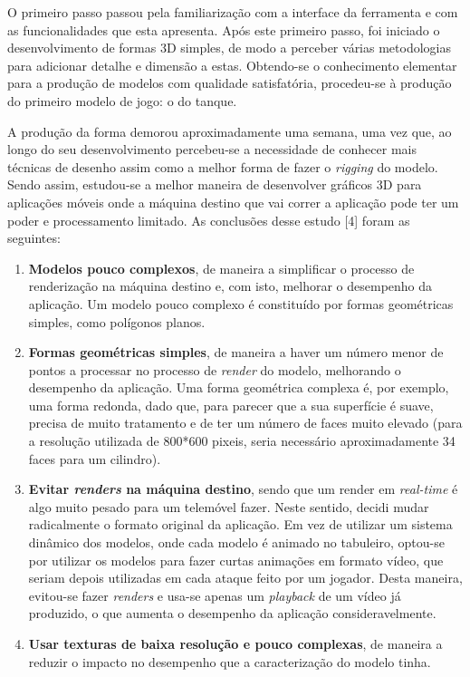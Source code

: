 O primeiro passo passou pela familiarização com a interface da ferramenta e com as funcionalidades que esta apresenta. Após este primeiro passo, foi iniciado o desenvolvimento de formas 3D simples, de modo a perceber várias metodologias para adicionar detalhe e dimensão a estas. Obtendo-se o conhecimento elementar para a produção de modelos com qualidade satisfatória, procedeu-se à produção do primeiro modelo de jogo: o do tanque.

A produção da forma demorou aproximadamente uma semana, uma vez que, ao longo do seu desenvolvimento percebeu-se a necessidade de conhecer mais técnicas de desenho assim como a melhor forma de fazer o \textit{rigging} do modelo.
Sendo assim, estudou-se a melhor maneira de desenvolver gráficos 3D para aplicações móveis onde a máquina destino que vai correr a aplicação pode ter um poder e processamento limitado. As conclusões desse estudo [4] foram as seguintes:
\begin{enumerate}
    \item \textbf{Modelos pouco complexos}, de maneira a simplificar o processo de renderização na máquina destino e, com isto, melhorar o desempenho da aplicação. Um modelo pouco complexo é constituído por formas geométricas simples, como polígonos planos.
    \item \textbf{Formas geométricas simples}, de maneira a haver um número menor de pontos a processar no processo de \textit{render} do modelo, melhorando o desempenho da aplicação. Uma forma geométrica complexa é, por exemplo, uma forma redonda, dado que, para parecer que a sua superfície é suave, precisa de muito tratamento e de ter um número de faces muito elevado (para a resolução utilizada de 800*600 pixeis, seria necessário aproximadamente 34 faces para um cilindro).
    \item \textbf{Evitar \textit{renders} na máquina destino}, sendo que um render em \textit{real-time} é algo muito pesado para um telemóvel fazer. Neste sentido, decidi mudar radicalmente o formato original da aplicação. Em vez de utilizar um sistema dinâmico dos modelos, onde cada modelo é animado no tabuleiro, optou-se por utilizar os modelos para fazer curtas animações em formato vídeo, que seriam depois utilizadas em cada ataque feito por um jogador. Desta maneira, evitou-se fazer \textit{renders} e usa-se apenas um \textit{playback} de um vídeo já produzido, o que aumenta o desempenho da aplicação consideravelmente. 
    \item \textbf{Usar texturas de baixa resolução e pouco complexas}, de maneira a reduzir o impacto no desempenho que a caracterização do modelo tinha.
\end{enumerate}

